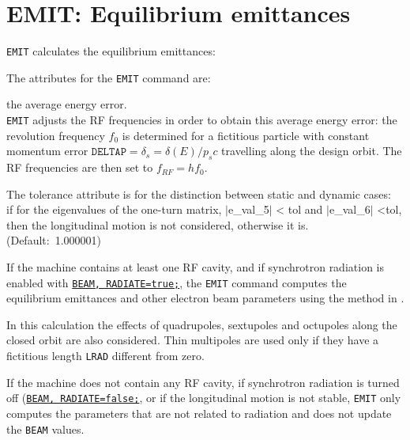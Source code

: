 
\chapter{EMIT: Equilibrium emittances} 
\label{chap:emit}

\texttt{EMIT} calculates the equilibrium emittances: 

\vspace{5mm}

The attributes for the \texttt{EMIT} command are: 

\begin{madlist}
   the average energy error. \\
  \texttt{EMIT} adjusts the RF frequencies in order to obtain this
  average energy error: the revolution frequency $f_0$
  is determined for a fictitious particle with constant momentum error  
  $\mathtt{DELTAP} = \delta_s = \delta(E) / p_s c$ travelling along the
  design orbit. The RF frequencies are then set to   
  $f_{RF} = h f_0$. 

   The tolerance attribute is for the distinction between
  static and dynamic cases: \\
  if for the eigenvalues of the one-turn matrix, $|$e\_val\_5$|$ \textless
  tol and $|$e\_val\_6$|$ \textless tol, then the longitudinal motion is
  not considered, otherwise it is. \\
  (Default:~1.000001)  
\end{madlist}


If the machine contains at least one RF cavity, and if synchrotron
radiation is enabled with \hyperref[sec:beam]{\texttt{BEAM,
    RADIATE=true;}}, the 
\texttt{EMIT} command computes the equilibrium emittances and other
electron beam parameters using the method in \cite{chao1979}.

In this calculation the effects of quadrupoles, sextupoles and
octupoles along the closed orbit are also considered. Thin multipoles are
used only if they have a fictitious length \texttt{LRAD} different from zero.  

If the machine does not contain any RF cavity, if synchrotron radiation is
turned off (\hyperref[sec:beam]{\texttt{BEAM, RADIATE=false;}}, or if the longitudinal
motion is not stable, \texttt{EMIT} only computes the parameters that
are not related to radiation and does not update the \texttt{BEAM} values.

